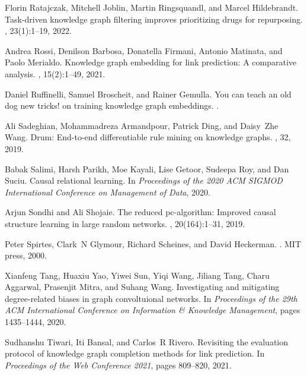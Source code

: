 \documentclass[11pt]{article}
\begin{document}
\begin{thebibliography}{10}
Florin Ratajczak, Mitchell Joblin, Martin Ringsquandl, and Marcel Hildebrandt.
\newblock Task-driven knowledge graph filtering improves prioritizing drugs for
  repurposing.
, 23(1):1--19, 2022.

Andrea Rossi, Denilson Barbosa, Donatella Firmani, Antonio Matinata, and Paolo
  Merialdo.
\newblock Knowledge graph embedding for link prediction: A comparative
  analysis.
,
  15(2):1--49, 2021.

Daniel Ruffinelli, Samuel Broscheit, and Rainer Gemulla.
\newblock You can teach an old dog new tricks! on training knowledge graph
  embeddings.
.

Ali Sadeghian, Mohammadreza Armandpour, Patrick Ding, and Daisy~Zhe Wang.
\newblock Drum: End-to-end differentiable rule mining on knowledge graphs.
, 32, 2019.

Babak Salimi, Harsh Parikh, Moe Kayali, Lise Getoor, Sudeepa Roy, and Dan
  Suciu.
\newblock Causal relational learning.
\newblock In {\em Proceedings of the 2020 ACM SIGMOD International Conference
  on Management of Data}, 2020.

Arjun Sondhi and Ali Shojaie.
\newblock The reduced pc-algorithm: Improved causal structure learning in large
  random networks.
, 20(164):1--31, 2019.

Peter Spirtes, Clark~N Glymour, Richard Scheines, and David Heckerman.
.
\newblock MIT press, 2000.

Xianfeng Tang, Huaxiu Yao, Yiwei Sun, Yiqi Wang, Jiliang Tang, Charu Aggarwal,
  Prasenjit Mitra, and Suhang Wang.
\newblock Investigating and mitigating degree-related biases in graph
  convoltuional networks.
\newblock In {\em Proceedings of the 29th ACM International Conference on
  Information \& Knowledge Management}, pages 1435--1444, 2020.

Sudhanshu Tiwari, Iti Bansal, and Carlos~R Rivero.
\newblock Revisiting the evaluation protocol of knowledge graph completion
  methods for link prediction.
\newblock In {\em Proceedings of the Web Conference 2021}, pages 809--820,
  2021.


\end{thebibliography}
\end{document}
